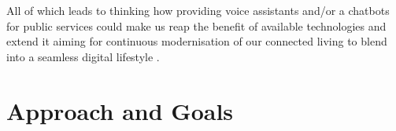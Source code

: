 




All of which leads to thinking how providing voice assistants and/or a chatbots for public services could make us reap the benefit of available technologies and extend it aiming for continuous modernisation of our connected living to blend into a seamless digital lifestyle \cite{dai:cl}. 






\section{Approach and Goals}
\label{approachgoals}



